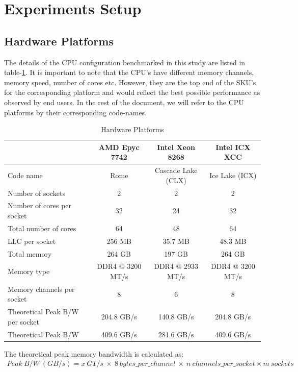 \documentclass{article}
\begin{document}
\section{Experiments Setup}
\subsection{Hardware Platforms}
The details of the CPU configuration benchmarked in this study are listed in table-\ref{table:1}. It is important to note that the CPU's have different memory channels, memory speed, number of cores etc. However, they are the top end of the SKU's for the corresponding platform and would reflect the best possible performance as observed by end users. In the rest of the document, we will refer to the CPU platforms by their corresponding code-names.

\begin{table}[h!]
\centering
 \begin{tabular}{|l|c|c|c|} \hline
& AMD Epyc 7742 & Intel Xeon 8268 & Intel ICX XCC \\\hline
Code name & Rome & Cascade Lake (CLX) & Ice Lake (ICX) \\ \hline
Number of sockets & 2 & 2 & 2 \\ \hline
Number of cores per socket & 32 & 24 & 32 \\ \hline
Total number of cores & 64 & 48 & 64 \\ \hline
LLC per socket & 256 MB & 35.7 MB & 48.3 MB \\ \hline
Total memory & 264 GB & 197 GB & 264 GB \\ \hline
Memory type & DDR4 @ 3200 MT/s & DDR4 @ 2933 MT/s & DDR4 @ 3200 MT/s \\ \hline
Memory channels per socket & 8 & 6 & 8 \\ \hline
Theoretical Peak B/W per socket & 204.8 GB/s & 140.8 GB/s & 204.8 GB/s\\   \hline
Theoretical Peak B/W & 409.6 GB/s & 281.6 GB/s & 409.6 GB/s\\   \hline
\end{tabular}
\caption{Hardware Platforms}
\label{table:1}
\end{table}

The theoretical peak memory bandwidth is calculated as: 
\begin{align*}
 Peak\: B/W\: (GB/s) = x\: GT/s\: \times\: 8 \:bytes\_per\_channel\: \times\:  n\: channels\_per\_socket \times m\: sockets
\end{align*}
\end{document}
